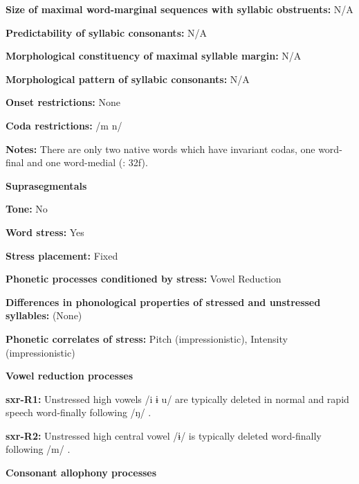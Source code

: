 \textbf{Size of maximal word{}-marginal sequences with syllabic obstruents:} N/A



\textbf{Predictability of syllabic consonants:} N/A



\textbf{Morphological constituency of maximal syllable margin:} N/A



\textbf{Morphological pattern of syllabic consonants:} N/A



\textbf{Onset restrictions:} None



\textbf{Coda restrictions:} /m n/



\textbf{Notes:} There are only two native words which have invariant codas, one word-final and one word-medial (\citealt{Pan2012}: 32f).



\textbf{Suprasegmentals}



\textbf{Tone:} No



\textbf{Word stress:} Yes



\textbf{Stress placement:} Fixed



\textbf{Phonetic processes conditioned by stress:} Vowel Reduction



\textbf{Differences in phonological properties of stressed and unstressed syllables:} (None)



\textbf{Phonetic correlates of stress:} Pitch (impressionistic), Intensity (impressionistic)



\textbf{Vowel reduction processes}



\textbf{sxr-R1:} Unstressed high vowels /i ɨ u/ are typically deleted in normal and rapid speech word-finally following /ŋ/ \citep[38]{Pan2012}.



\textbf{sxr-R2:} Unstressed high central vowel /ɨ/ is typically deleted word-finally following /m/ \citep[39]{Pan2012}.



\textbf{Consonant allophony processes}



